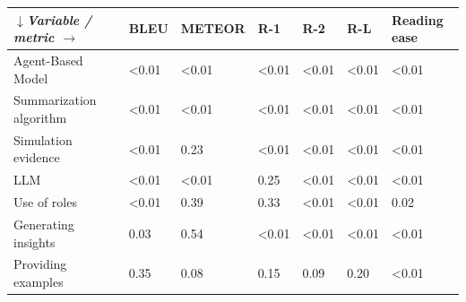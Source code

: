 \begin{tabular}{|l|l|l|l|l|l|l|}
\hline
\textit{$\downarrow$Variable / metric $\rightarrow$} & BLEU & METEOR & R-1 & R-2 & R-L & Reading ease \\
 \hline
 Agent-Based Model & \textless{}0.01 & \textless{}0.01 & \textless{}0.01 & \textless{}0.01 & \textless{}0.01 & \textless{}0.01 \\
 \hline
 Summarization algorithm & \textless{}0.01 & \textless{}0.01 & \textless{}0.01 & \textless{}0.01 & \textless{}0.01 & \textless{}0.01 \\
 \hline
 Simulation evidence & \textless{}0.01 & 0.23 & \textless{}0.01 & \textless{}0.01 & \textless{}0.01 & \textless{}0.01 \\
 \hline
 LLM & \textless{}0.01 & \textless{}0.01 & 0.25 & \textless{}0.01 & \textless{}0.01 & \textless{}0.01 \\
 \hline
 Use of roles & \textless{}0.01 & 0.39 & 0.33 & \textless{}0.01 & \textless{}0.01 & 0.02 \\
 \hline
 Generating insights & 0.03 & 0.54 & \textless{}0.01 & \textless{}0.01 & \textless{}0.01 & \textless{}0.01 \\
 \hline
 Providing examples & 0.35 & 0.08 & 0.15 & 0.09 & 0.20 & \textless{}0.01 \\
\hline
\end{tabular}
